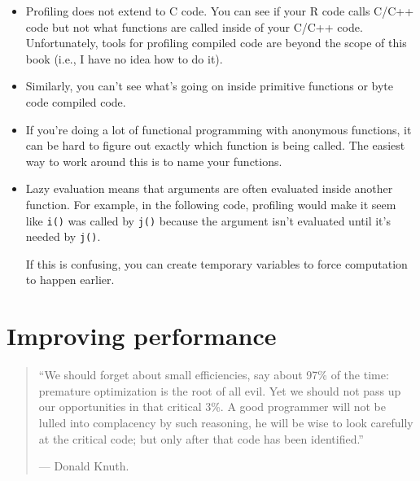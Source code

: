 \begin{itemize}
\item
  Profiling does not extend to C code. You can see if your R code calls
  C/C++ code but not what functions are called inside of your C/C++
  code. Unfortunately, tools for profiling compiled code are beyond the
  scope of this book (i.e., I have no idea how to do it).
\item
  Similarly, you can't see what's going on inside primitive functions or
  byte code compiled code.
\item
  If you're doing a lot of functional programming with anonymous
  functions, it can be hard to figure out exactly which function is
  being called. The easiest way to work around this is to name your
  functions.
\item
  Lazy evaluation means that arguments are often evaluated inside
  another function. For example, in the following code, profiling would
  make it seem like \texttt{i()} was called by \texttt{j()} because the
  argument isn't evaluated until it's needed by \texttt{j()}.

\begin{Shaded}
\begin{Highlighting}[]
\StringTok{ }\NormalTok{() \{}
  \NormalTok{(}\NormalTok{)}
\NormalTok{\}}
\StringTok{ }
\OperatorTok{+}\StringTok{ }
\NormalTok{\}}
\NormalTok{(}\NormalTok{())}
\end{Highlighting}
\end{Shaded}

  If this is confusing, you can create temporary variables to force
  computation to happen earlier.
\end{itemize}

\hypertarget{improve-perf}{%
\section{Improving performance}\label{improve-perf}}

\begin{quote}
``We should forget about small efficiencies, say about 97\% of the time:
premature optimization is the root of all evil. Yet we should not pass
up our opportunities in that critical 3\%. A good programmer will not be
lulled into complacency by such reasoning, he will be wise to look
carefully at the critical code; but only after that code has been
identified.''

--- Donald Knuth.
\end{quote}

